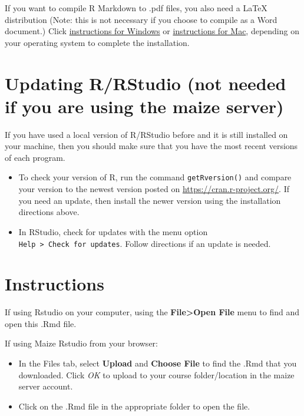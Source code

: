 \documentclass[
]{book}
\begin{document}
If you want to compile R Markdown to .pdf files, you also need a LaTeX distribution (Note: this is not necessary if you choose to compile as a Word document.) Click \href{http://www.miktex.org/}{instructions for Windows} or \href{https://tug.org/mactex/}{instructions for Mac}, depending on your operating system to complete the installation.

\hypertarget{updating-rrstudio-not-needed-if-you-are-using-the-maize-server}{%
\section{Updating R/RStudio (not needed if you are using the maize server)}\label{updating-rrstudio-not-needed-if-you-are-using-the-maize-server}}

If you have used a local version of R/RStudio before and it is still installed on your machine, then you should make sure that you have the most recent versions of each program.

\begin{itemize}
\item
  To check your version of R, run the command \texttt{getRversion()} and compare your version to the newest version posted on \url{https://cran.r-project.org/}. If you need an update, then install the newer version using the installation directions above.
\item
  In RStudio, check for updates with the menu option \texttt{Help\ \textgreater{}\ Check\ for\ updates}. Follow directions if an update is needed.
\end{itemize}

\hypertarget{instructions}{%
\section{Instructions}\label{instructions}}

If using Rstudio on your computer, using the \textbf{File\textgreater Open File} menu to find and open this .Rmd file.

If using Maize Rstudio from your browser:

\begin{itemize}
\item
  In the Files tab, select \textbf{Upload} and \textbf{Choose File} to find the .Rmd that you downloaded. Click \emph{OK} to upload to your course folder/location in the maize server account.
\item
  Click on the .Rmd file in the appropriate folder to open the file.
\end{itemize}
\end{document}
